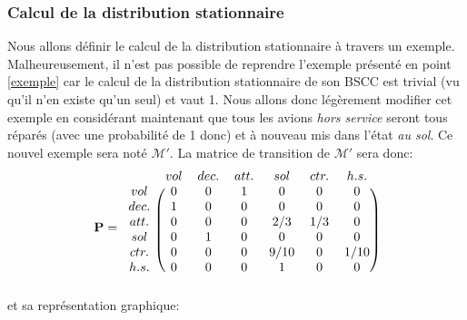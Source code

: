 \documentclass[letterpaper]{article}
\newcommand{\colornode}[1][]{\node[state,
	    align=center,
	    text=gray!40!black,
	    draw=gray,
	    fill=gray!20!white,{#1}]}
\newcommand{\bigcolornode}[1][]{\node[state,
	    align=center,
	    text=gray!40!black,
	    draw=gray,
	    fill=gray!20!white,
	    text width=1.7cm,{#1}]}
\newcommand{\drawedge}{\draw[every loop, line width=0.4mm, fill=gray, draw=gray]}
\begin{document}
    \subsubsection{Calcul de la distribution stationnaire}
      Nous allons définir le calcul de la distribution stationnaire à travers 
      un exemple.  Malheureusement, il n'est pas possible de reprendre l'exemple
      présenté en point \ref{exemple} car le calcul de la distribution stationnaire 
      de son BSCC est trivial (vu qu'il n'en existe qu'un seul) et vaut 1.
      Nous allons donc légèrement modifier cet exemple en considérant maintenant 
      que tous les avions \textit{hors service} seront tous réparés (avec une 
      probabilité de 1 donc) et à nouveau mis dans l'état \textit{au sol}.  
      Ce nouvel exemple sera noté $\mathcal{M}'$.
      La matrice de transition de $\mathcal{M}'$ sera donc:
      $$ \mathbf{P} = 
	\begin{blockarray}{ccccccc}
	& vol & dec. & att. & sol & ctr. & h.s. \\
	  \begin{block}{c(cccccc)}
	    vol  & 0 & 0 & 1 & 0    & 0   & 0    \\
	    dec. & 1 & 0 & 0 & 0    & 0   & 0    \\
	    att. & 0 & 0 & 0 & 2/3  & 1/3 & 0    \\
	    sol  & 0 & 1 & 0 & 0    & 0   & 0    \\
	    ctr. & 0 & 0 & 0 & 9/10 & 0   & 1/10 \\
	    h.s. & 0 & 0 & 0 & 1    & 0   & 0    \\
	  \end{block}
	\end{blockarray}
      $$
      et sa représentation graphique:
      \begin{center}
      \end{center}
\end{document}
